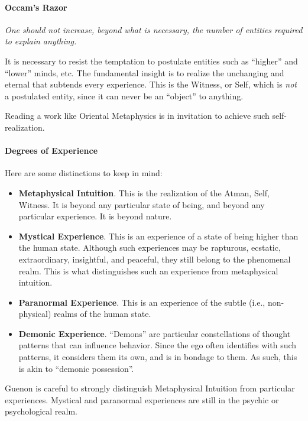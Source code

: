 \paragraph{Occam's Razor}
\emph{One should not increase, beyond what is necessary, the number of entities required to explain anything.}

It is necessary to resist the temptation to postulate entities such as “higher” and “lower” minds, etc. The fundamental insight is to realize the unchanging and eternal that subtends every experience. This is the Witness, or Self, which is \emph{not} a postulated entity, since it can never be an “object” to anything.

Reading a work like Oriental Metaphysics is in invitation to achieve such self-realization.

\paragraph{Degrees of Experience}
Here are some distinctions to keep in mind:

\begin{itemize}
\item \textbf{Metaphysical Intuition}. This is the realization of the Atman, Self, Witness. It is beyond any particular state of being, and beyond any particular experience. It is beyond nature. 
\item \textbf{Mystical Experience}. This is an experience of a state of being higher than the human state. Although such experiences may be rapturous, ecstatic, extraordinary, insightful, and peaceful, they still belong to the phenomenal realm. This is what distinguishes such an experience from metaphysical intuition. 
\item \textbf{Paranormal Experience}. This is an experience of the subtle (i.e., non-physical) realms of the human state. 
\item \textbf{Demonic Experience}. “Demons” are particular constellations of thought patterns that can influence behavior. Since the ego often identifies with such patterns, it considers them its own, and is in bondage to them. As such, this is akin to “demonic possession”. 
\end{itemize}
Guenon is careful to strongly distinguish Metaphysical Intuition from particular experiences. Mystical and paranormal experiences are still in the psychic or psychological realm.

